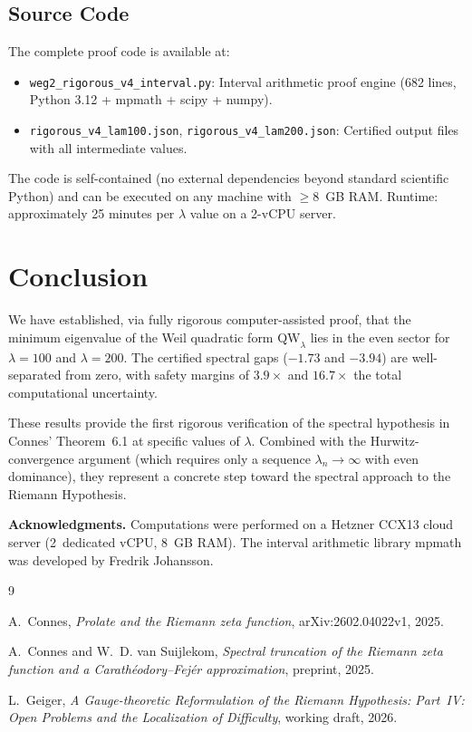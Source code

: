 \documentclass[12pt,a4paper]{article}
\theoremstyle{definition}
\theoremstyle{remark}
\begin{document}
\subsection{Source Code}

The complete proof code is available at:
\begin{itemize}
  \item \texttt{weg2\_rigorous\_v4\_interval.py}: Interval arithmetic proof engine (682 lines, Python 3.12 + mpmath + scipy + numpy).
  \item \texttt{rigorous\_v4\_lam100.json}, \texttt{rigorous\_v4\_lam200.json}: Certified output files with all intermediate values.
\end{itemize}
The code is self-contained (no external dependencies beyond standard scientific Python) and can be executed on any machine with $\geq 8$~GB RAM. Runtime: approximately 25 minutes per $\lambda$ value on a 2-vCPU server.


\section{Conclusion}
\label{sec:conclusion}

We have established, via fully rigorous computer-assisted proof, that the minimum eigenvalue of the Weil quadratic form $\mathrm{QW}_\lambda$ lies in the even sector for $\lambda = 100$ and $\lambda = 200$. The certified spectral gaps ($-1.73$ and $-3.94$) are well-separated from zero, with safety margins of $3.9\times$ and $16.7\times$ the total computational uncertainty.

These results provide the first rigorous verification of the spectral hypothesis in Connes' Theorem~6.1 at specific values of $\lambda$. Combined with the Hurwitz-convergence argument (which requires only a sequence $\lambda_n \to \infty$ with even dominance), they represent a concrete step toward the spectral approach to the Riemann Hypothesis.

\bigskip
\noindent\textbf{Acknowledgments.} Computations were performed on a Hetzner CCX13 cloud server (2~dedicated vCPU, 8~GB RAM). The interval arithmetic library mpmath was developed by Fredrik Johansson.


\begin{thebibliography}{9}

A.~Connes, \emph{Prolate and the Riemann zeta function}, arXiv:2602.04022v1, 2025.

A.~Connes and W.~D. van Suijlekom, \emph{Spectral truncation of the Riemann zeta function and a Carath\'eodory--Fej\'er approximation}, preprint, 2025.

L.~Geiger, \emph{A Gauge-theoretic Reformulation of the Riemann Hypothesis: Part~IV: Open Problems and the Localization of Difficulty}, working draft, 2026.

\end{thebibliography}
\end{document}
